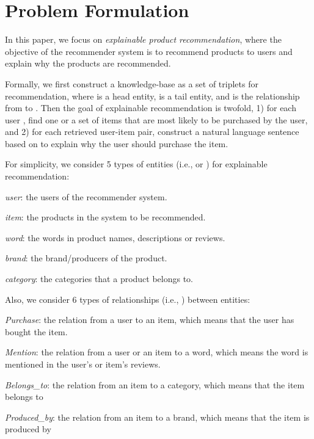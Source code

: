 \documentclass[algorithms,article,accept,moreauthors,pdftex,10pt,a4paper]{Definitions/mdpi}
\begin{document}
\section{Problem Formulation}\label{sec:formalization}

In this paper, we focus on \textit{explainable product recommendation}, where the objective of the recommender system is to recommend products to users and explain why the products are recommended.


Formally, we first construct a knowledge-base as a set of triplets  for recommendation, where  is a head entity,  is a tail entity, and  is the relationship from  to .
Then the goal of explainable recommendation is twofold, 1) for each user , find one or a set of items  that are most likely to be purchased by the user, and 2) for each retrieved user-item pair, construct a natural language sentence based on  to explain why the user should purchase the item.


\noindent
For simplicity, we consider 5 types of entities (i.e.,  or ) for explainable recommendation:

\vspace{6 pt}
{ \textit{user}}: the users of the recommender system.

 \textit{item}: the products in the system to be recommended.

 \textit{word}: the words in product names, descriptions or reviews.

 \textit{brand}: the brand/producers of the product.

 \textit{category}: the categories that a product belongs to. 
\vspace{6 pt}




\noindent
\vspace{6 pt} Also, we consider 6 types of relationships (i.e., ) between entities:

 \textit{Purchase}: the relation from a user to an item, which means that the user has bought the item.

 \textit{Mention}: the relation from a user or an item to a word, which means the word is mentioned in the user's or item's reviews.

 \textit{Belongs\_to}: the relation from an item to a category, which means that the item belongs to 

 \textit{Produced\_by}: the relation from an item to a brand, which means that the item is produced by 
\end{document}
